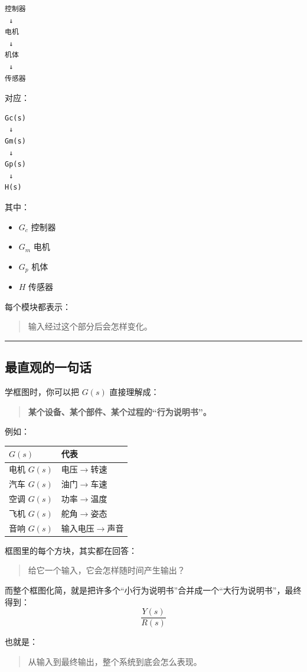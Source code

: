 \documentclass[UTF8,a4paper,11pt]{ctexart}
\begin{document}
\begin{verbatim}
控制器
 ↓
电机
 ↓
机体
 ↓
传感器
\end{verbatim}

对应：

\begin{verbatim}
Gc(s)
 ↓
Gm(s)
 ↓
Gp(s)
 ↓
H(s)
\end{verbatim}

其中：

\begin{itemize}
  \item $G_c$ 控制器
  \item $G_m$ 电机
  \item $G_p$ 机体
  \item $H$ 传感器
\end{itemize}

每个模块都表示：

\begin{quote}
输入经过这个部分后会怎样变化。
\end{quote}

\bigskip\noindent\rule{\linewidth}{0.4pt}\bigskip

\subsection{最直观的一句话}

学框图时，你可以把 $G(s)$ 直接理解成：

\begin{quote}
\textbf{某个设备、某个部件、某个过程的“行为说明书”。}
\end{quote}

例如：

\begin{center}
\begin{tabular}{ll}
\toprule
$G(s)$ & 代表 \\
\midrule
电机 $G(s)$ & 电压$\rightarrow$转速 \\
汽车 $G(s)$ & 油门$\rightarrow$车速 \\
空调 $G(s)$ & 功率$\rightarrow$温度 \\
飞机 $G(s)$ & 舵角$\rightarrow$姿态 \\
音响 $G(s)$ & 输入电压$\rightarrow$声音 \\
\bottomrule
\end{tabular}
\end{center}

框图里的每个方块，其实都在回答：

\begin{quote}
给它一个输入，它会怎样随时间产生输出？
\end{quote}

而整个框图化简，就是把许多个“小行为说明书”合并成一个“大行为说明书”，最终得到：
\[
\frac{Y(s)}{R(s)}
\]

也就是：

\begin{quote}
从输入到最终输出，整个系统到底会怎么表现。
\end{quote}
\end{document}
